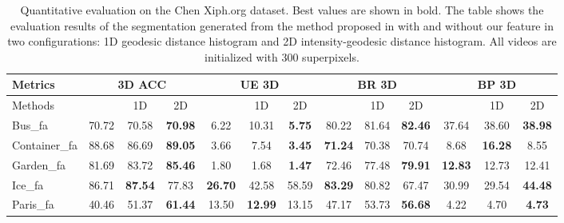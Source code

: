 \documentclass[runningheads]{llncs}
\begin{document}
\begin{table}[]
\centering
\caption{Quantitative evaluation on the Chen Xiph.org dataset. Best values are shown in bold. The table shows the evaluation results of the segmentation generated from the method proposed in \cite{Yu_2015_ICCV} with and without our feature in two configurations: 1D geodesic distance histogram and 2D intensity-geodesic distance histogram. All videos are initialized with 300 superpixels.}
\begin{center}
\begin{adjustbox}{max width=\textwidth}
\label{cptb2}
\begin{tabular}{|l|c|c|c|c|c|c|c|c|c|c|c|c|}
\hline
Metrics       & \multicolumn{3}{c|}{3D ACC}                               & \multicolumn{3}{c|}{UE 3D}                                & \multicolumn{3}{c|}{BR 3D}                       & \multicolumn{3}{c|}{BP 3D}                                \\ \hline
Methods       & \cite{Yu_2015_ICCV} & 1D             & 2D             & \cite{Yu_2015_ICCV} & 1D             & 2D             & \cite{Yu_2015_ICCV} & 1D    & 2D             & \cite{Yu_2015_ICCV} & 1D             & 2D             \\ \hline
Bus\_fa       & 70.72                   & 70.58          & \textbf{70.98} & 6.22                    & 10.31          & \textbf{5.75}  & 80.22                   & 81.64 & \textbf{82.46} & 37.64                   & 38.60          & \textbf{38.98} \\ \hline
Container\_fa & 88.68                   & 86.69          & \textbf{89.05} & 3.66                    & 7.54           & \textbf{3.45}  & \textbf{71.24}          & 70.38 & 70.74          & 8.68                    & \textbf{16.28} & 8.55           \\ \hline
Garden\_fa    & 81.69                   & 83.72          & \textbf{85.46} & 1.80                    & 1.68           & \textbf{1.47}  & 72.46                   & 77.48 & \textbf{79.91} & \textbf{12.83}          & 12.73          & 12.41          \\ \hline
Ice\_fa       & 86.71                   & \textbf{87.54} & 77.83          & \textbf{26.70}          & 42.58          & 58.59          & \textbf{83.29}          & 80.82 & 67.47          & 30.99                   & 29.54          & \textbf{44.48} \\ \hline
Paris\_fa     & 40.46                   & 51.37          & \textbf{61.44} & 13.50                   & \textbf{12.99} & 13.15          & 47.17                   & 53.73 & \textbf{56.68} & 4.22                    & 4.70           & \textbf{4.73}  \\ \hline

\end{tabular}
\end{adjustbox}
\end{center}
\end{table}
\end{document}
